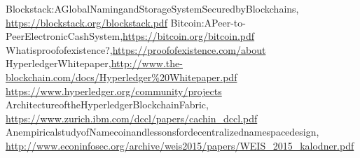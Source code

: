 \begin{thebibliography}{99}
Blockstack:\enspace A\enspace Global\enspace Naming\enspace and\enspace Storage\enspace System\enspace Secured\enspace by\enspace Blockchains,\\ \url{https://blockstack.org/blockstack.pdf}
Bitcoin:\enspace A\enspace Peer-to-Peer\enspace Electronic\enspace Cash\enspace System,\enspace \url{https://bitcoin.org/bitcoin.pdf} 
What\enspace is\enspace proof\enspace of\enspace existence\enspace ?,\enspace \url{https://proofofexistence.com/about}
Hyperledger\enspace Whitepaper,\enspace \url{http://www.the-blockchain.com/docs/Hyperledger\%20Whitepaper.pdf} 
\url{https://www.hyperledger.org/community/projects}
Architecture\enspace of\enspace the\enspace Hyperledger\enspace Blockchain\enspace Fabric,\\ \url{https://www.zurich.ibm.com/dccl/papers/cachin_dccl.pdf}
An\enspace empirical\enspace study\enspace of\enspace Namecoin\enspace and\enspace lessons\enspace for\enspace decentralized\enspace namespace\enspace design,\\ \url{http://www.econinfosec.org/archive/weis2015/papers/WEIS_2015_kalodner.pdf}
\end{thebibliography}
